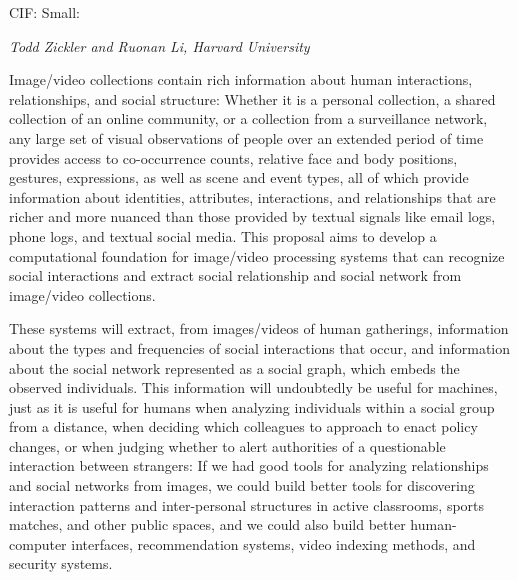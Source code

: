 \pagestyle{empty}

\noindent\textsf{CIF: Small:}\vspace{0.9ex}\\

\vspace{1.0ex}
\noindent \textsf{\large \em Todd Zickler and Ruonan Li, Harvard University}
\vspace{2.0ex}



\noindent Image/video collections contain rich information about human interactions, relationships, and social structure: Whether it is a personal collection, a shared collection of an online community, or a collection from a surveillance network, any large set of visual observations of people over an extended period of time provides access to co-occurrence counts, relative face and body positions, gestures, expressions, as well as scene and event types, all of which provide information about identities, attributes, interactions, and relationships that are richer and more nuanced than those provided by textual signals like email logs, phone logs, and textual social media. This proposal aims to develop a computational foundation for image/video processing systems that can recognize social interactions and extract social relationship and social network from image/video collections. 

These systems will extract, from images/videos of human gatherings, information about the types and frequencies of social interactions that occur, and information about the social network represented as a social graph, which embeds the observed individuals. This information will undoubtedly be useful for machines, just as it is useful for humans when analyzing individuals within a social group from a distance, when deciding which colleagues to approach to enact policy changes, or when judging whether to alert authorities of a questionable interaction between strangers: If we had good tools for analyzing relationships and social networks from images, we could build better tools for discovering interaction patterns and inter-personal structures in active classrooms, sports matches, and other public spaces, and we could also build better human-computer interfaces, recommendation systems, video indexing methods, and security systems.

